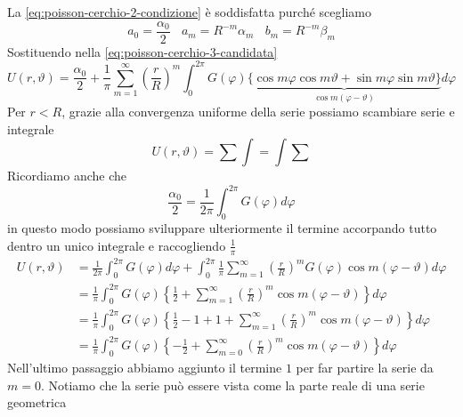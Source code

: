 \begin{dimostrazione}
    La \eqref{eq:poisson-cerchio-2-condizione} è soddisfatta purché scegliamo
    \begin{equation*}
        a_{0} =\frac{\alpha _{0}}{2} \ \ \ \ a_{m} =R^{-m} \alpha _{m} \ \ \ \ b_{m} =R^{-m} \beta _{m}
    \end{equation*}
    Sostituendo nella \eqref{eq:poisson-cerchio-3-candidata}
    \begin{equation*}
        U(r,\vartheta) =\frac{\alpha _{0}}{2} +\frac{1}{\pi }\sum\limits ^{\infty }_{m=1}\left(\frac{r}{R}\right)^{m}\int ^{2\pi }_{0} G(\varphi)\underbrace{\{\cos m\varphi \cos m\vartheta +\sin m\varphi \sin m\vartheta \}}_{\cos m(\varphi -\vartheta)} d\varphi
    \end{equation*}
    Per $r< R$, grazie alla convergenza uniforme della serie possiamo scambiare serie e integrale
    \begin{equation*}
        U(r,\vartheta) =\sum \int =\int \sum
    \end{equation*}
    Ricordiamo anche che
    \begin{equation*}
        \frac{\alpha _{0}}{2} =\frac{1}{2\pi }\int ^{2\pi }_{0} G(\varphi) d\varphi
    \end{equation*}
    in questo modo possiamo sviluppare ulteriormente il termine accorpando tutto dentro un unico integrale e raccogliendo $\frac{1}{\pi }$
    \begin{align}
        U(r,\vartheta) & =\frac{1}{2\pi }\int ^{2\pi }_{0} G(\varphi) d\varphi +\int ^{2\pi }_{0}\frac{1}{\pi }\sum\limits ^{\infty }_{m=1}\left(\frac{r}{R}\right)^{m} G(\varphi)\cos m(\varphi -\vartheta) d\varphi \nonumber \\
                       & =\frac{1}{\pi }\int ^{2\pi }_{0} G(\varphi)\left\{\frac{1}{2} +\sum\limits ^{\infty }_{m=1}\left(\frac{r}{R}\right)^{m}\cos m(\varphi -\vartheta)\right\} d\varphi \nonumber                           \\
                       & =\frac{1}{\pi }\int ^{2\pi }_{0} G(\varphi)\left\{\frac{1}{2} -1+1+\sum\limits ^{\infty }_{m=1}\left(\frac{r}{R}\right)^{m}\cos m(\varphi -\vartheta)\right\} d\varphi \nonumber                       \\
                       & =\frac{1}{\pi }\int ^{2\pi }_{0} G(\varphi)\left\{-\frac{1}{2} +\sum\limits ^{\infty }_{m=0}\left(\frac{r}{R}\right)^{m}\cos m(\varphi -\vartheta)\right\} d\varphi \label{eq:poisson-cerchio-1}
    \end{align}
    Nell'ultimo passaggio abbiamo aggiunto il termine $1$ per far partire la serie da $m=0$. Notiamo che la serie può essere vista come la parte reale di una serie geometrica

\end{dimostrazione}
